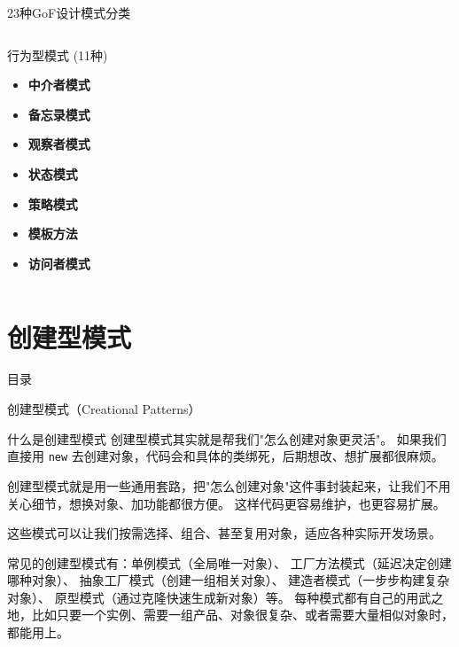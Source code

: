 \documentclass[UTF8,aspectratio=169]{beamer}
\begin{document}
\begin{frame}{23种GoF设计模式分类}
\begin{columns}
\begin{column}{0.32\textwidth}
\begin{ytublock}{行为型模式 (11种)}
\begin{itemize}
                    \item \textbf{中介者模式}
                    \item \textbf{备忘录模式}
                    \item \textbf{观察者模式}
                    \item \textbf{状态模式}
                    \item \textbf{策略模式}
                    \item \textbf{模板方法}
                    \item \textbf{访问者模式}
                \end{itemize}
            \end{ytublock}
        \end{column}
    \end{columns}
\end{frame}

\section{创建型模式}
\begin{frame}{目录}
    \begin{multicols}{2}
    \end{multicols}
\end{frame}

\begin{frame}{创建型模式（Creational Patterns）}
    \begin{ytublock}{什么是创建型模式}
        创建型模式其实就是帮我们"怎么创建对象更灵活"。
        如果我们直接用 \texttt{new} 去创建对象，代码会和具体的类绑死，后期想改、想扩展都很麻烦。

        创建型模式就是用一些通用套路，把"怎么创建对象"这件事封装起来，让我们不用关心细节，想换对象、加功能都很方便。
        这样代码更容易维护，也更容易扩展。

        这些模式可以让我们按需选择、组合、甚至复用对象，适应各种实际开发场景。

        常见的创建型模式有：单例模式（全局唯一对象）、
        工厂方法模式（延迟决定创建哪种对象）、
        抽象工厂模式（创建一组相关对象）、
        建造者模式（一步步构建复杂对象）、
        原型模式（通过克隆快速生成新对象）等。
        每种模式都有自己的用武之地，比如只要一个实例、需要一组产品、对象很复杂、或者需要大量相似对象时，都能用上。
    \end{ytublock}
\end{frame}
\end{document}
